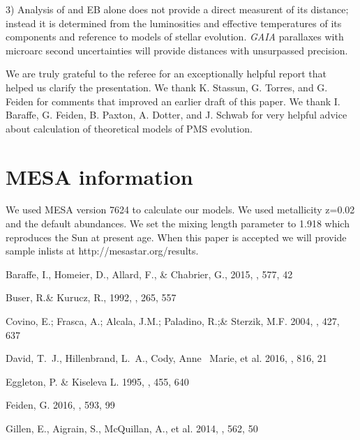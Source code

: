 \documentclass[12pt,preprint]{aastex6}
\begin{document}
{3) Analysis of and EB alone does not provide a direct measurent
of its distance; instead it is determined from the
luminosities and effective temperatures of its components
and reference to models of stellar evolution.  {\it GAIA} 
parallaxes
with microarc second uncertainties will provide distances with
unsurpassed precision.

\acknowledgements

We are truly grateful to the referee for an exceptionally helpful
report that helped us clarify the presentation.
We thank K. Stassun, G. Torres, and G. Feiden for
comments that improved an earlier draft of this paper.
We thank I. Baraffe, G. Feiden, B. Paxton, A. 
Dotter, and J. Schwab for very helpful advice about  
calculation of theoretical models of PMS evolution.

\appendix

\section{MESA information}

We used MESA version 7624 to calculate our models.  
We used metallicity z=0.02
and the default abundances.  We set the mixing length 
parameter to 1.918 which 
reproduces the Sun at present age.  When this paper 
is accepted we will 
provide sample inlists at http://mesastar.org/results.
 


\begin{thebibliography}{}

 Baraffe, I., Homeier, D.,
Allard, F., \& Chabrier, G., 2015, \aap, 577, 42

 Buser, R.\& Kurucz, R.,
1992, \aap, 265, 557

 Covino, E.; Frasca, A.; Alcala, J.M.;
Paladino, R.;\& Sterzik, M.F. 2004, \aap, 427, 637


 David, T.~J., Hillenbrand, 
L.~A., Cody, Anne ~Marie, et al. 2016, \apj, 816, 21 

 Eggleton, P. \&
Kiseleva L. 1995, \apj, 455, 640


 Feiden, G. 2016, 
\aap, 593, 99

 Gillen, E., Aigrain, S.,
McQuillan, A., et al. 2014, \aap, 562, 50



\end{thebibliography}}
\end{document}
